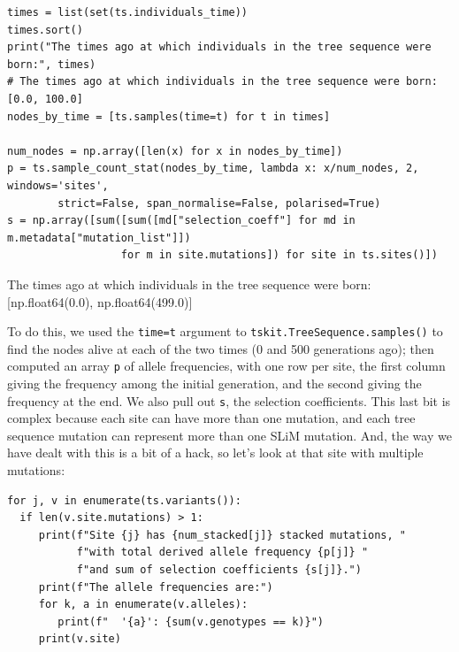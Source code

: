 \documentclass[12pt]{article}
\begin{document}
\begin{listing}[H]
    \begin{verbatim}
times = list(set(ts.individuals_time))
times.sort()
print("The times ago at which individuals in the tree sequence were born:", times)
# The times ago at which individuals in the tree sequence were born: [0.0, 100.0]
nodes_by_time = [ts.samples(time=t) for t in times]

num_nodes = np.array([len(x) for x in nodes_by_time])
p = ts.sample_count_stat(nodes_by_time, lambda x: x/num_nodes, 2, windows='sites',
        strict=False, span_normalise=False, polarised=True)
s = np.array([sum([sum([md["selection_coeff"] for md in m.metadata["mutation_list"]])
                  for m in site.mutations]) for site in ts.sites()])
    \end{verbatim}
\end{listing}
\begin{pycon}
The times ago at which individuals in the tree sequence were born: [np.float64(0.0), np.float64(499.0)]
\end{pycon}

To do this, we used the \verb|time=t| argument to \verb|tskit.TreeSequence.samples()| to find the nodes alive at each of the two times (0 and 500 generations ago);
then computed an array \verb|p| of allele frequencies, with one row per site,
the first column giving the frequency among the initial generation,
and the second giving the frequency at the end.
We also pull out \verb|s|, the selection coefficients.
This last bit is complex because each site can have more than one mutation,
and each tree sequence mutation can represent more than one SLiM mutation.
And, the way we have dealt with this is a bit of a hack, so let’s look at that site with multiple mutations:

\begin{listing}[H]
    \begin{verbatim}
for j, v in enumerate(ts.variants()):
  if len(v.site.mutations) > 1:
     print(f"Site {j} has {num_stacked[j]} stacked mutations, "
           f"with total derived allele frequency {p[j]} "
           f"and sum of selection coefficients {s[j]}.")
     print(f"The allele frequencies are:")
     for k, a in enumerate(v.alleles):
        print(f"  '{a}': {sum(v.genotypes == k)}")
     print(v.site)
    \end{verbatim}
\end{listing}
\end{document}
